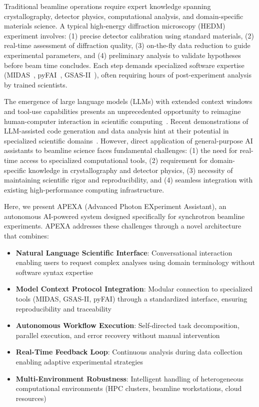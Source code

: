 \documentclass[11pt]{article}
\begin{document}
Traditional beamline operations require expert knowledge spanning crystallography, detector physics, computational analysis, and domain-specific materials science. A typical high-energy diffraction microscopy (HEDM) experiment involves: (1) precise detector calibration using standard materials, (2) real-time assessment of diffraction quality, (3) on-the-fly data reduction to guide experimental parameters, and (4) preliminary analysis to validate hypotheses before beam time concludes. Each step demands specialized software expertise (MIDAS~\cite{sharma2012new}, pyFAI~\cite{ashiotis2015fast}, GSAS-II~\cite{toby2013gsas}), often requiring hours of post-experiment analysis by trained scientists.

The emergence of large language models (LLMs) with extended context windows and tool-use capabilities presents an unprecedented opportunity to reimagine human-computer interaction in scientific computing~\cite{brown2020language, achiam2023gpt4}. Recent demonstrations of LLM-assisted code generation and data analysis hint at their potential in specialized scientific domains~\cite{zhang2023scientific}. However, direct application of general-purpose AI assistants to beamline science faces fundamental challenges: (1) the need for real-time access to specialized computational tools, (2) requirement for domain-specific knowledge in crystallography and detector physics, (3) necessity of maintaining scientific rigor and reproducibility, and (4) seamless integration with existing high-performance computing infrastructure.

Here, we present APEXA (Advanced Photon EXperiment Assistant), an autonomous AI-powered system designed specifically for synchrotron beamline experiments. APEXA addresses these challenges through a novel architecture that combines:

\begin{itemize}
    \item \textbf{Natural Language Scientific Interface}: Conversational interaction enabling users to request complex analyses using domain terminology without software syntax expertise
    \item \textbf{Model Context Protocol Integration}: Modular connection to specialized tools (MIDAS, GSAS-II, pyFAI) through a standardized interface, ensuring reproducibility and traceability
    \item \textbf{Autonomous Workflow Execution}: Self-directed task decomposition, parallel execution, and error recovery without manual intervention
    \item \textbf{Real-Time Feedback Loop}: Continuous analysis during data collection enabling adaptive experimental strategies
    \item \textbf{Multi-Environment Robustness}: Intelligent handling of heterogeneous computational environments (HPC clusters, beamline workstations, cloud resources)
\end{itemize}
\end{document}
